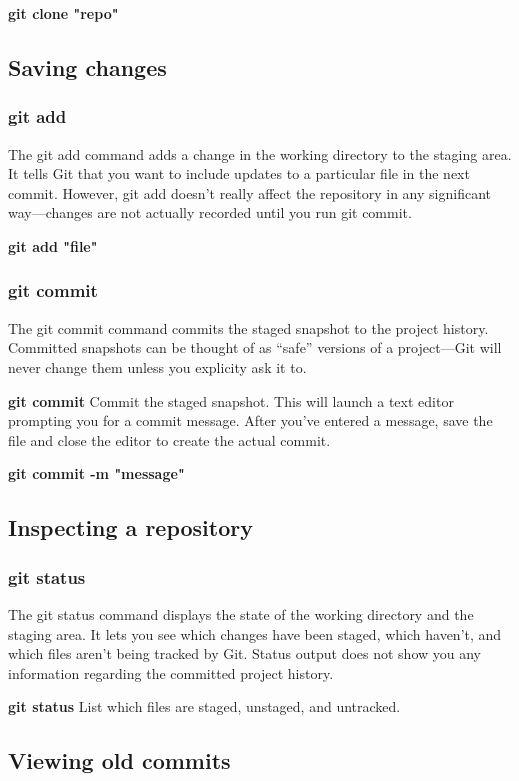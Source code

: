 \documentclass{article}
\begin{document}
    \textbf{git clone "repo"}
	
	\subsection{Saving changes}
	\subsubsection{git add}

The git add command adds a change in the working directory to the staging area. It tells Git that you want to include updates to a particular file in the next commit. However, git add doesn't really affect the repository in any significant way—changes are not actually recorded until you run git commit.

\textbf{git add "file"}
	
	\subsubsection{git commit}

The git commit command commits the staged snapshot to the project history. Committed snapshots can be thought of as “safe” versions of a project—Git will never change them unless you explicity ask it to. 


\textbf{git commit}
Commit the staged snapshot. This will launch a text editor prompting you for a commit message. After you’ve entered a message, save the file and close the editor to create the actual commit. 

\textbf{git commit -m "message"}
	
	\subsection{Inspecting a repository}
	\subsubsection{git status}

The git status command displays the state of the working directory and the staging area. It lets you see which changes have been staged, which haven’t, and which files aren’t being tracked by Git. Status output does not show you any information regarding the committed project history.

\textbf{git status}
List which files are staged, unstaged, and untracked.

\subsection{Viewing old commits}
\end{document}
